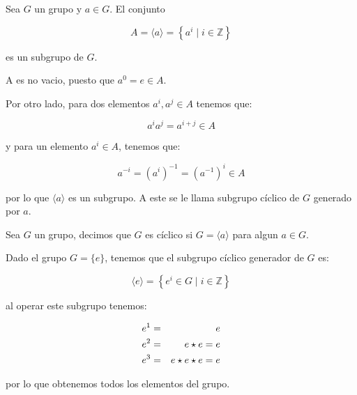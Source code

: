         \begin{definicion}
            Sea $G$ un grupo y $a \in G$. El conjunto

            \begin{equation}
                A = \langle a \rangle = \left\{ a^i \mid i \in \mathbb{Z} \right\}
            \end{equation}

            es un subgrupo de $G$.

            A es no vacio, puesto que $a^0 = e \in A$.

            Por otro lado, para dos elementos $a^i, a^j \in A$ tenemos que:

            \begin{equation*}
                a^i a^j = a^{i+j} \in A
            \end{equation*}

            y para un elemento $a^i \in A$, tenemos que:

            \begin{equation*}
                a^{-i} = \left( a^i \right)^{-1} = \left( a^{-1} \right)^i \in A
            \end{equation*}

            por lo que $\langle a \rangle$ es un subgrupo. A este se le llama subgrupo cíclico de $G$ generado por $a$.
        \end{definicion}

        \begin{definicion}
            Sea $G$ un grupo, decimos que $G$ es cíclico si $G = \langle a \rangle$ para algun $a \in G$.
        \end{definicion}

        \begin{ejemplo}
            Dado el grupo $G = \{e\}$, tenemos que el subgrupo cíclico generador de $G$ es:

            \begin{equation*}
                \langle e \rangle = \left\{ e^i \in G \mid i \in \mathbb{Z} \right\}
            \end{equation*}

            al operar este subgrupo tenemos:

            \begin{eqnarray*}
                e^1 & = & e \\
                e^2 & = & e \star e = e \\
                e^3 & = & e \star e \star e = e
            \end{eqnarray*}

            por lo que obtenemos todos los elementos del grupo.
        \end{ejemplo}

